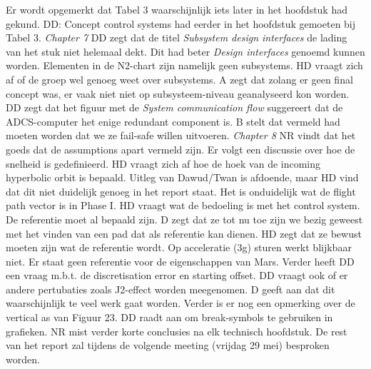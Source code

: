 Er wordt opgemerkt dat Tabel 3 waarschijnlijk iets later in het hoofdstuk had gekund.
DD: Concept control systems had eerder in het hoofdstuk gemoeten bij Tabel 3.
\newline\newline
\textit{Chapter 7}\newline
DD zegt dat de titel \textit{Subsystem design interfaces} de lading van het stuk niet helemaal dekt. Dit had beter \textit{Design interfaces} genoemd kunnen worden. Elementen in de N2-chart zijn namelijk geen subsystems.\newline
HD vraagt zich af of de groep wel genoeg weet over subsystems. A zegt dat zolang er geen final concept was, er vaak niet niet op subsysteem-niveau geanalyseerd kon worden.\newline
DD zegt dat het figuur met de \textit{System communication flow} suggereert dat de ADCS-computer het enige redundant component is. B stelt dat vermeld had moeten worden dat we ze fail-safe willen uitvoeren.
\newline\newline
\textit{Chapter 8}\newline
NR vindt dat het goeds dat de assumptions apart vermeld zijn. Er volgt een discussie over hoe de snelheid is gedefinieerd. HD vraagt zich af hoe de hoek van de incoming hyperbolic orbit is bepaald. Uitleg van Dawud/Twan is afdoende, maar HD vind dat dit niet duidelijk genoeg in het report staat. Het is onduidelijk wat de flight path vector is in Phase I.\newline
HD vraagt wat de bedoeling is met het control system. De referentie moet al bepaald zijn. D zegt dat ze tot nu toe zijn we bezig geweest met het vinden van een pad dat als referentie kan dienen. HD zegt dat ze bewust moeten zijn wat de referentie wordt. Op acceleratie (3g) sturen werkt blijkbaar niet.\newline
Er staat geen referentie voor de eigenschappen van Mars. Verder heeft DD een vraag m.b.t. de discretisation error en starting offset.\newline
DD vraagt ook of er andere pertubaties zoals J2-effect worden meegenomen. D geeft aan dat dit waarschijnlijk te veel werk gaat worden.\newline
Verder is er nog een opmerking over de vertical as van Figuur 23. DD raadt aan om break-symbols te gebruiken in grafieken. NR mist verder korte conclusies na elk technisch hoofdstuk.
\newline\newline
De rest van het report zal tijdens de volgende meeting (vrijdag 29 mei) besproken worden.

